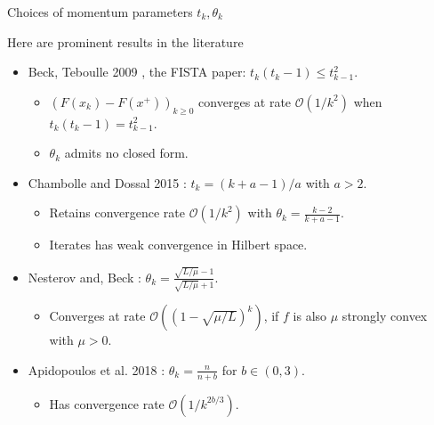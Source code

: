\documentclass[11pt]{beamer}
\theoremstyle{definition}
\begin{document}
    \begin{frame}{Choices of momentum parameters $t_k, \theta_k$}
        \begin{block}{Here are prominent results in the literature}
            \begin{itemize}
                \item Beck, Teboulle 2009 \cite{beck_fast_2009}, the FISTA paper: $t_k (t_k - 1) \le t_{k - 1}^2$. 
                    \begin{itemize}
                        \item $(F(x_k) - F(x^+))_{k \ge 0}$ converges at rate $\mathcal O(1/k^2)$ when $t_k(t_k - 1) = t_{k - 1}^2$. 
                        \item $\theta_k$ admits no closed form. 
                    \end{itemize}
                \item Chambolle and Dossal 2015 \cite{chambolle_convergence_2015}: $t_k = (k + a -1)/a$ with $a > 2$. 
                    \begin{itemize}
                        \item Retains convergence rate $\mathcal O(1/k^2)$ with $\theta_{k} = \frac{k - 2}{k + a - 1}$. 
                        \item Iterates has weak convergence in Hilbert space. 
                    \end{itemize}
                \item Nesterov \cite{nesterov_lectures_2018} and, Beck \cite{beck_first-order_2017}
                : $\theta_k = \frac{\sqrt{L/\mu} - 1}{\sqrt{L/\mu} + 1}$.
                    \begin{itemize}
                        \item Converges at rate $\mathcal O\left(\left(1 - \sqrt{\mu/L}\right)^k\right)$, if $f$ is also $\mu$ strongly convex with $\mu > 0$. 
                    \end{itemize}
                \item Apidopoulos et al. 2018 \cite{apidopoulos_convergence_2018}: $\theta_k = \frac{n}{n + b}$ for $b \in (0, 3)$. 
                \begin{itemize}
                    \item Has convergence rate $\mathcal O(1/k^{2b/3})$. 
                \end{itemize}
            \end{itemize}    
        \end{block}
    \end{frame}
\end{document}
